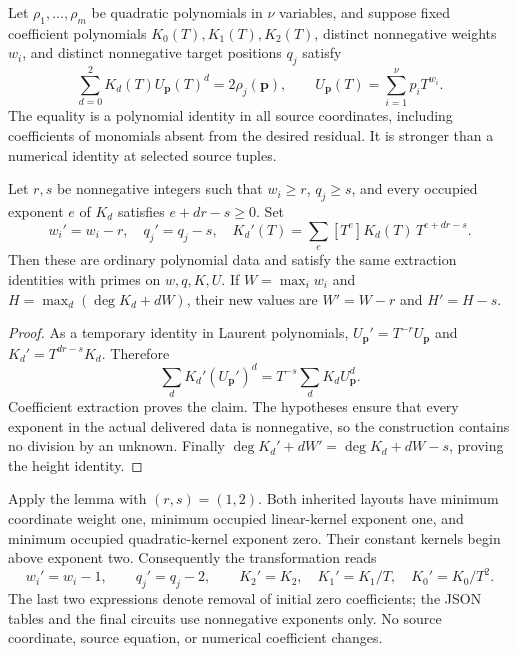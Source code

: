 Let $\rho_1,\ldots,\rho_m$ be quadratic polynomials in $\nu$ variables,
and suppose fixed coefficient polynomials $K_0(T),K_1(T),K_2(T)$, distinct
nonnegative weights $w_i$, and distinct nonnegative target positions $q_j$
satisfy
\begin{equation}
 [T^{q_j}]\sum_{d=0}^{2}K_d(T)U_{\mathbf p}(T)^d
       =2\rho_j(\mathbf p),\qquad
 U_{\mathbf p}(T)=\sum_{i=1}^{\nu}p_iT^{w_i}.
 \label{eq:origin-extraction}
\end{equation}
The equality is a polynomial identity in all source coordinates, including
coefficients of monomials absent from the desired residual.  It is stronger
than a numerical identity at selected source tuples.

\begin{lemma}
\label{lem:radix-origin}
Let $r,s$ be nonnegative integers such that $w_i\ge r$, $q_j\ge s$, and
every occupied exponent $e$ of $K_d$ satisfies $e+dr-s\ge0$.
Set
\[
 w_i'=w_i-r,\quad q_j'=q_j-s,\quad
 K_d'(T)=\sum_e [T^e]K_d(T)\,T^{e+dr-s}.
\]
Then these are ordinary polynomial data and satisfy the same extraction
identities with primes on $w,q,K,U$.
If $W=\max_iw_i$ and
$H=\max_d(\deg K_d+dW)$, their new values are
$W'=W-r$ and $H'=H-s$.
\end{lemma}

\begin{proof}
As a temporary identity in Laurent polynomials,
$U_{\mathbf p}'=T^{-r}U_{\mathbf p}$ and
$K_d'=T^{dr-s}K_d$.  Therefore
\[
 \sum_d K_d'(U_{\mathbf p}')^d
       =T^{-s}\sum_dK_dU_{\mathbf p}^d.
\]
Coefficient extraction proves the claim.  The hypotheses ensure that every
exponent in the actual delivered data is nonnegative, so the construction
contains no division by an unknown.  Finally
$\deg K_d'+dW'=\deg K_d+dW-s$, proving the height identity.
\end{proof}

Apply the lemma with $(r,s)=(1,2)$.  Both inherited layouts have minimum
coordinate weight one, minimum occupied linear-kernel exponent one, and
minimum occupied quadratic-kernel exponent zero.  Their constant kernels
begin above exponent two.  Consequently the transformation reads
\begin{equation}
 w_i'=w_i-1,\qquad q_j'=q_j-2,\qquad
 K_2'=K_2,\quad K_1'=K_1/T,\quad K_0'=K_0/T^2.
 \label{eq:origin-shift}
\end{equation}
The last two expressions denote removal of initial zero coefficients;
the JSON tables and the final circuits use nonnegative exponents only.
No source coordinate, source equation, or numerical coefficient changes.

